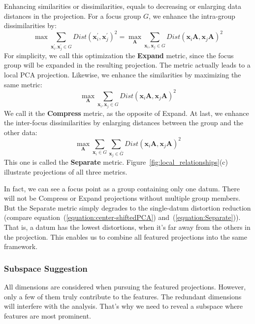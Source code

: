 Enhancing similarities or dissimilarities, equals to decreasing or enlarging data distances in the projection. For a focus group $G$, we enhance the intra-group dissimilarities by:
\begin{equation}
\max \sum\limits_{\mathbf{x}_{i}^{\prime}, \mathbf{x}_{j}^{\prime} \in G} Dist(\mathbf{x}_{i}^{\prime}, \mathbf{x}_{j}^{\prime})^{2} = \max_{\mathbf{A}} \sum\limits_{\mathbf{x}_{i}, \mathbf{x}_{j} \in G} Dist(\mathbf{x}_{i}\mathbf{A}, \mathbf{x}_{j}\mathbf{A})^{2}
\end{equation}
For simplicity, we call this optimization the \textbf{Expand} metric, since the focus group will be expanded in the resulting projection. The metric actually leads to a local PCA projection. Likewise, we enhance the similarities by maximizing the same metric:
\begin{equation}
\max_{\mathbf{A}} \sum\limits_{\mathbf{x}_{i}, \mathbf{x}_{j} \in G} Dist(\mathbf{x}_{i}\mathbf{A}, \mathbf{x}_{j}\mathbf{A})^{2}
\end{equation}
We call it the \textbf{Compress} metric, as the opposite of Expand. At last, we enhance the inter-focus dissimilarities by enlarging distances between the group and the other data:
\begin{equation}
\label{equation:Separate}
\max_{\mathbf{A}} \sum\limits_{\mathbf{x}_{i} \in G} \sum\limits_{\mathbf{x}_{j} \in \bar{G}} Dist(\mathbf{x}_{i}\mathbf{A}, \mathbf{x}_{j}\mathbf{A})^{2}
\end{equation}
This one is called the \textbf{Separate} metric. Figure~\ref{fig:local_relationships}(c) illustrate projections of all three metrics.

In fact, we can see a focus point as a group containing only one datum. There will not be Compress or Expand projections without multiple group members. But the Separate metric simply degrades to the single-datum distortion reduction (compare equation~(\ref{equation:center-shiftedPCA}) and~(\ref{equation:Separate})). That is, a datum has the lowest distortions, when it's far away from the others in the projection. This enables us to combine all featured projections into the same framework.

\subsubsection{Subspace Suggestion}
All dimensions are considered when pursuing the featured projections. However, only a few of them truly contribute to the features. The redundant dimensions will interfere with the analysis. That's why we need to reveal a subspace where features are most prominent.

